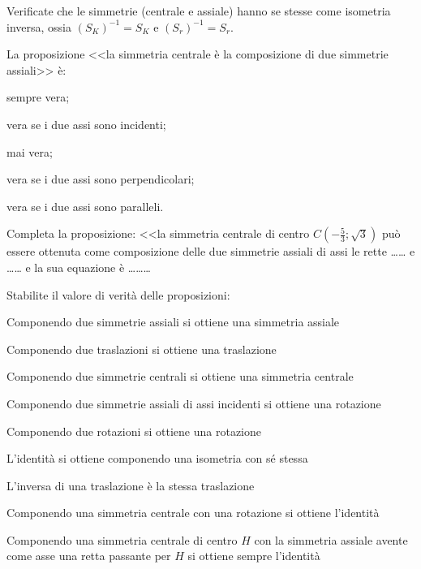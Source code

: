 \begin{esercizio}
\label{ese:8.83} %
Verificate che le simmetrie (centrale e assiale) hanno se stesse come 
isometria inversa, ossia $(S_K)^{-1}=S_K$ e $(S_r)^{-1}=S_r$.
\end{esercizio}

\begin{esercizio}
\label{ese:8.84} %
La proposizione <<la simmetria centrale è la composizione di due 
simmetrie assiali>> è:
\begin{enumeratea}
\item sempre vera;
\item vera se i due assi sono incidenti;
\item mai vera;
\item vera se i due assi sono perpendicolari;
\item vera se i due assi sono paralleli.
\end{enumeratea}
\end{esercizio}

\begin{esercizio}
\label{ese:8.85} %
Completa la proposizione: <<la simmetria centrale di centro 
$C\left(-\frac{5}{3};\sqrt{3}\right)$ può essere ottenuta come 
composizione delle due simmetrie assiali di assi le rette 
\ldots\ldots{} e \ldots\ldots{} e la sua equazione è 
\ldots\ldots\ldots{}
\end{esercizio}

\begin{esercizio}
\label{ese:8.86} %
Stabilite il valore di verità delle proposizioni:
\begin{enumeratea}
\item Componendo due simmetrie assiali si ottiene una simmetria 
assiale\hfill\boxV\quad\boxF
\item Componendo due traslazioni si ottiene una 
traslazione\hfill\boxV\quad\boxF
\item Componendo due simmetrie centrali si ottiene una simmetria 
centrale\hfill\boxV\quad\boxF
\item Componendo due simmetrie assiali di assi incidenti si ottiene 
una rotazione\hfill\boxV\quad\boxF
\item Componendo due rotazioni si ottiene una 
rotazione\hfill\boxV\quad\boxF
\item L'identità si ottiene componendo una isometria con sé 
stessa\hfill\boxV\quad\boxF
\item L'inversa di una traslazione è la stessa 
traslazione\hfill\boxV\quad\boxF
\item Componendo una simmetria centrale con una rotazione si ottiene 
l'identità\hfill\boxV\quad\boxF
\item Componendo una simmetria centrale di centro $H$ con la 
simmetria assiale avente come asse una retta passante per $H$ si 
ottiene sempre l'identità\hfill\boxV\quad\boxF
\end{enumeratea}
\end{esercizio}


